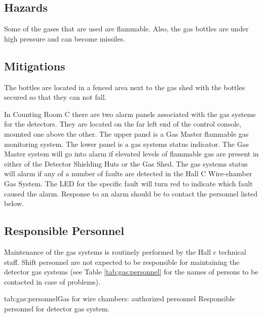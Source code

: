 \begin{safetyen}{0}{0}
\label{sec:hallc-det-gasalarms}

\subsection{Hazards}

Some of the gases that are used are flammable.  Also, the gas bottles
are under high pressure and can become missiles.

\subsection{Mitigations}

The bottles are located in a fenced area next to the gas shed with the bottles
secured so that they can not fall.

In Counting Room C there are two alarm panels associated with the gas
systems for the detectors.  They are located on the far left end of the
control console, mounted one above the other.  The upper panel is a
Gas Master flammable gas monitoring system.  The lower panel is a gas
systems status indicator.  The Gas Master system will go into alarm if
elevated levels of flammable gas are present in either of the Detector
Shielding Huts or the Gas Shed.
The gas systems status will
alarm if any of a number of faults are detected in the Hall C Wire-chamber
Gas System.  The LED for the specific fault will turn red to indicate which
fault caused the alarm.
Response to an alarm should be to contact the personnel listed below.

\subsection{Responsible Personnel}

Maintenance of the gas systems is routinely performed by the Hall c
technical staff.  Shift personnel are not expected to be responsible
for maintaining the detector gas systems (see Table \ref{tab:gas:personnel}
for the names of persons to be contacted in case of problems).

\begin{namestab}{tab:gas:personnel}{Gas for wire chambers: authorized personnel
}{%
      Responsible personnel for detector gas system.}
  \BradSawatzky{}
  \JackSegal{}
\end{namestab}
\end{safetyen}
